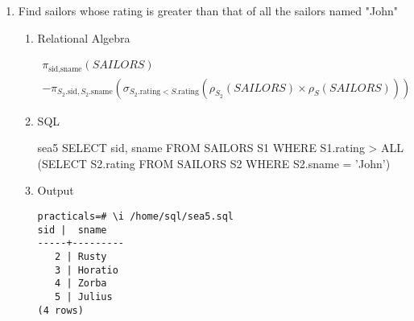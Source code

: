 \begin{enumerate}
\begin{enumerate}
		            \begin{equation*}
			            \pi_{\text{sid}} - \pi_{\text{sid}}(SAILORS \bowtie \sigma_{\text{date\_of\_birth}\; >\; \text{Jan 2018}}(RESERVES))
		            \end{equation*}

		      \item SQL
		            \begin{sqlQuery}{sea4}
                    SELECT sid FROM SAILORS 
                    WHERE sid NOT IN 
                        (SELECT sid FROM RESERVES 
                        WHERE date_of_birth > '2018-01-01')
                    \end{sqlQuery}

		      \item Output
		            \begin{lstlisting}[style=output]
practicals=# \i /home/sql/sea4.sql
sid
-----
3
4
5
(3 rows)
                        \end{lstlisting}

	      \end{enumerate}

	\item  Find sailors whose rating is greater than that of all the sailors named "John"
	      \begin{enumerate}
		      \item Relational Algebra

		            \begin{multline*}
			            \pi_{\text{sid}, \text{sname}}(SAILORS) \\
			            - \pi_{S_2.\text{sid},S_2.\text{sname}}(\sigma_{S_2.\text{rating} < S.\text{rating}}(\rho_{S_2}(SAILORS)\times \rho_S(SAILORS)))
		            \end{multline*}
		            \pagebreak

		      \item SQL

		            \begin{sqlQuery}{sea5}
                        SELECT sid, sname FROM SAILORS S1
                        WHERE S1.rating > ALL
                                (SELECT S2.rating FROM SAILORS S2
                                WHERE S2.sname = 'John')
                    \end{sqlQuery}

		      \item Output
		            \begin{lstlisting}[style=output]
practicals=# \i /home/sql/sea5.sql
sid |  sname  
-----+---------
   2 | Rusty
   3 | Horatio
   4 | Zorba
   5 | Julius
(4 rows)
                        \end{lstlisting}


\end{enumerate}
\end{enumerate}
